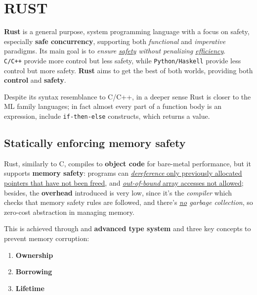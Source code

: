 \chapter{RUST}
\textbf{Rust} is a general purpose, system programming language
with a focus on safety, especially \textbf{safe concurrency},
supporting both \textit{functional} and \textit{imperative} paradigms.
Its main goal is to \textit{ensure \underline{safety} without penalizing \underline{efficiency}}.\\
\texttt{C/C++} provide more control but less safety, while \texttt{Python/Haskell} provide less control but more safety.
\textbf{Rust} aims to get the best of both worlds, providing both \textbf{control} and \textbf{safety}.

Despite its syntax resemblance to C/C++, in a deeper sense Rust is closer to the ML family languages;
in fact almost every part of a function body is an expression, include \texttt{if-then-else} constructs, which returns a value.

\section{Statically enforcing memory safety}
Rust, similarly to C, compiles to \textbf{object code} for bare-metal performance,
but it supports \textbf{memory safety}:
programs can \ul{\textit{dereference} only previously allocated pointers that have
not been freed}, and \ul{\textit{out-of-bound} array accesses not allowed};
besides, the \textbf{overhead} introduced is very low, since it's the \textit{compiler} which checks that memory safety rules are followed,
and there's \textit{\underline{no} garbage collection}, so zero-cost abstraction in managing memory.\\
{This is achieved through and \textbf{advanced type system} and three key concepts to prevent memory corruption:\ns
\begin{enumerate}
   \item \textbf{Ownership}
   \item \textbf{Borrowing}
   \item \textbf{Lifetime}
\end{enumerate}}

